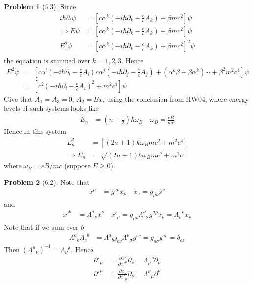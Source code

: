 \documentclass[twoside,11pt]{article}
\newcommand{\lms}{\fontfamily{lmss}\selectfont} %
\theoremstyle{definition}
\newtheorem{problem}{Problem}
\theoremstyle{remark}
\begin{document}
\begin{problem}[5.3]
Since
\begin{align*}
    i\hbar\partial_t\psi &= 
    \left[c\alpha^k\left(-i\hbar \partial_k - \frac{e}{c}A_k\right)+ \beta mc^2\right]\psi\\
    \Rightarrow
    E\psi &= 
    \left[c\alpha^k\left(-i\hbar \partial_k - \frac{e}{c}A_k\right)+ \beta mc^2\right]\psi\\
    E^2\psi &= 
    \left[c\alpha^k\left(-i\hbar \partial_k - \frac{e}{c}A_k\right)+ \beta mc^2\right]^2\psi\\
\end{align*}
the equation is summed over $k=1,2,3$.
Hence
\begin{align*}
    E^2\psi &= 
    \left[
    c\alpha^i\left(-i\hbar \partial_i - \frac{e}{c}A_i\right)
    c\alpha^j\left(-i\hbar \partial_j - \frac{e}{c}A_j\right)
    + (\alpha^k\beta + \beta\alpha^k)\cdots
    + \beta^2 m^2c^4
    \right]\psi\\
    &= \left[
    c^2\left(-i\hbar \partial_i - \frac{e}{c}A_i\right)^2
    + m^2c^4
    \right]\psi
\end{align*}
Give that $A_1=A_3=0$, $A_2=Bx$, 
using the conclusion from {\lms HW04}, where energy levels of such systems looks like
\begin{align*}
    E_n &= \left(n + \frac{1}{2}\right)\hbar\omega_B\quad
    \omega_B = \frac{eB}{mc}
\end{align*}
Hence in this system
\begin{align*}
    E_n^2 &= \left[
    (2n+1)\hbar\omega_B mc^2 + m^2c^4
    \right]\\
    \Rightarrow E_n &= 
    \sqrt{(2n+1)\hbar\omega_B mc^2 + m^2c^4}
\end{align*}
where $\omega_B = eB/mc$ (suppose $E\geq 0$).

\end{problem}


\begin{problem}[6.2]
Note that
\begin{align*}
    x^\mu &= g^{\mu\nu}x_\nu\quad
    x_\mu = g_{\mu\nu}x^\nu
\end{align*}
and 
\begin{align*}
    {x'}^\mu &= {\Lambda^\mu}_\nu x^\nu\quad
    x'_\mu = g_{\mu\nu}{\Lambda^\nu}_\sigma g^{\sigma\rho}x_\rho = 
    {\Lambda_\rho}^\mu x_\rho
\end{align*}
Note that if we sum over $b$
\begin{align*}
    {\Lambda^a}_b{\Lambda_c}^b &=
    {\Lambda^a}_b g_{b\nu}{\Lambda^\nu}_\sigma g^{\sigma c}
    = g_{a\sigma}g^{\sigma c}
    = \delta_{ac}
\end{align*}
Then $({\Lambda^\mu}_\nu)^{-1} = {\Lambda_\nu}^\mu$.
Hence
\begin{align*}
    \partial'_\mu &= 
    \frac{\partial x^\nu}{\partial {x'}^\mu}\partial_\nu = {\Lambda_\mu}^\nu\partial_\nu\\
    {\partial'}^\mu &= 
    \frac{\partial x_\nu}{\partial x'_\mu}\partial_\nu = {\Lambda^\nu}_\mu\partial^\nu
\end{align*}

\end{problem}
\end{document}
